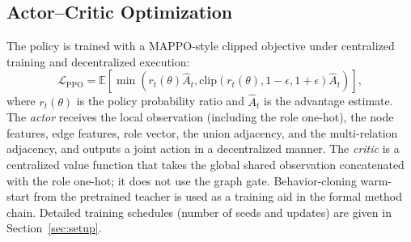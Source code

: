 \subsection{Actor--Critic Optimization}
\label{sec:optim}

The policy is trained with a MAPPO-style clipped objective under centralized training and decentralized execution:
\begin{equation}
    \mathcal{L}_{\mathrm{PPO}} =
    \mathbb{E}\left[
        \min\left(
            r_t(\theta)\hat{A}_t,
            \mathrm{clip}(r_t(\theta),1-\epsilon,1+\epsilon)\hat{A}_t
        \right)
    \right],
\label{eq:ppo}
\end{equation}
where $r_t(\theta)$ is the policy probability ratio and $\hat{A}_t$ is the advantage estimate. The \emph{actor} receives the local observation (including the role one-hot), the node features, edge features, role vector, the union adjacency, and the multi-relation adjacency, and outputs a joint action in a decentralized manner. The \emph{critic} is a centralized value function that takes the global shared observation concatenated with the role one-hot; it does not use the graph gate. Behavior-cloning warm-start from the pretrained teacher is used as a training aid in the formal method chain. Detailed training schedules (number of seeds and updates) are given in Section~\ref{sec:setup}.
